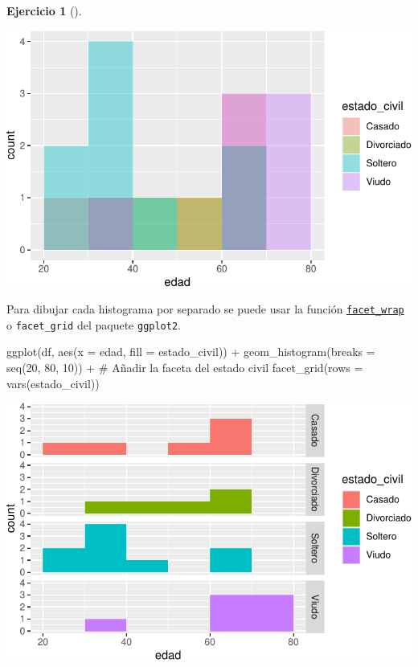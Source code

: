 \documentclass[
  a4paper,
]{scrreport}
\newenvironment{Shaded}{\begin{snugshade}}{\end{snugshade}}
\newcommand{\AttributeTok}[1]{\textcolor[rgb]{0.40,0.45,0.13}{#1}}
\newcommand{\CommentTok}[1]{\textcolor[rgb]{0.37,0.37,0.37}{#1}}
\newcommand{\DecValTok}[1]{\textcolor[rgb]{0.68,0.00,0.00}{#1}}
\newcommand{\FunctionTok}[1]{\textcolor[rgb]{0.28,0.35,0.67}{#1}}
\newcommand{\NormalTok}[1]{\textcolor[rgb]{0.00,0.23,0.31}{#1}}
\newcommand{\SpecialCharTok}[1]{\textcolor[rgb]{0.37,0.37,0.37}{#1}}
\theoremstyle{definition}
\newtheorem{exercise}{Ejercicio}[chapter]
\theoremstyle{remark}
\begin{document}
\begin{exercise}[]
\begin{enumerate}
\begin{tcolorbox}
  \includegraphics{03-frecuencias-graficos_files/figure-pdf/unnamed-chunk-34-1.pdf}

  Para dibujar cada histograma por separado se puede usar la función
  \href{https://aprendeconalf.es/manual-r/07-graficos.html\#facetas}{\texttt{facet\_wrap}}
  o \texttt{facet\_grid} del paquete \texttt{ggplot2}.

\begin{Shaded}
\begin{Highlighting}[]
\FunctionTok{ggplot}\NormalTok{(df, }\FunctionTok{aes}\NormalTok{(}\AttributeTok{x =}\NormalTok{ edad, }\AttributeTok{fill =}\NormalTok{ estado\_civil)) }\SpecialCharTok{+}
    \FunctionTok{geom\_histogram}\NormalTok{(}\AttributeTok{breaks =} \FunctionTok{seq}\NormalTok{(}\DecValTok{20}\NormalTok{, }\DecValTok{80}\NormalTok{, }\DecValTok{10}\NormalTok{)) }\SpecialCharTok{+}
    \CommentTok{\# Añadir la faceta del estado civil}
    \FunctionTok{facet\_grid}\NormalTok{(}\AttributeTok{rows =} \FunctionTok{vars}\NormalTok{(estado\_civil))}
\end{Highlighting}
\end{Shaded}

  \includegraphics{03-frecuencias-graficos_files/figure-pdf/unnamed-chunk-35-1.pdf}

  \end{tcolorbox}
\end{enumerate}

\end{exercise}
\end{document}
